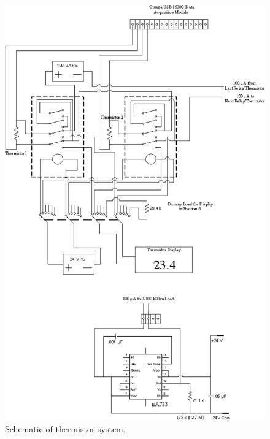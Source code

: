 \begin{figure}[h]
 \centering
 \includegraphics[width=\textwidth]{./img/subsystem-thermistor-schematic.png}
 \caption{Schematic of thermistor system.}
 \label{fig:subsystem-thermistor-schematic}
\end{figure}
